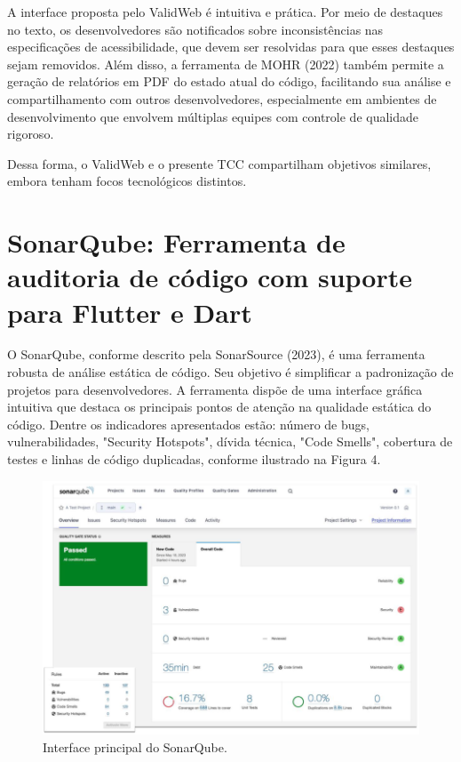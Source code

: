A interface proposta pelo ValidWeb é intuitiva e prática. Por meio de destaques no texto, os desenvolvedores são notificados sobre inconsistências nas especificações de acessibilidade, que devem ser resolvidas para que esses destaques sejam removidos. Além disso, a ferramenta de MOHR (2022) também permite a geração de relatórios em PDF do estado atual do código, facilitando sua análise e compartilhamento com outros desenvolvedores, especialmente em ambientes de desenvolvimento que envolvem múltiplas equipes com controle de qualidade rigoroso.

Dessa forma, o ValidWeb e o presente TCC compartilham objetivos similares, embora tenham focos tecnológicos distintos.

\section{SonarQube: Ferramenta de auditoria de código com suporte para Flutter e Dart}

O SonarQube, conforme descrito pela SonarSource (2023), é uma ferramenta robusta de análise estática de código. Seu objetivo é simplificar a padronização de projetos para desenvolvedores. A ferramenta dispõe de uma interface gráfica intuitiva que destaca os principais pontos de atenção na qualidade estática do código. Dentre os indicadores apresentados estão: número de bugs, vulnerabilidades, "Security Hotspots", dívida técnica, "Code Smells", cobertura de testes e linhas de código duplicadas, conforme ilustrado na Figura 4.

\begin{figure}[!h]
	\centering
	\caption{Interface principal do SonarQube.}
	\includegraphics[width=432pt]{Assets/SonarQube.png}
\end{figure}


